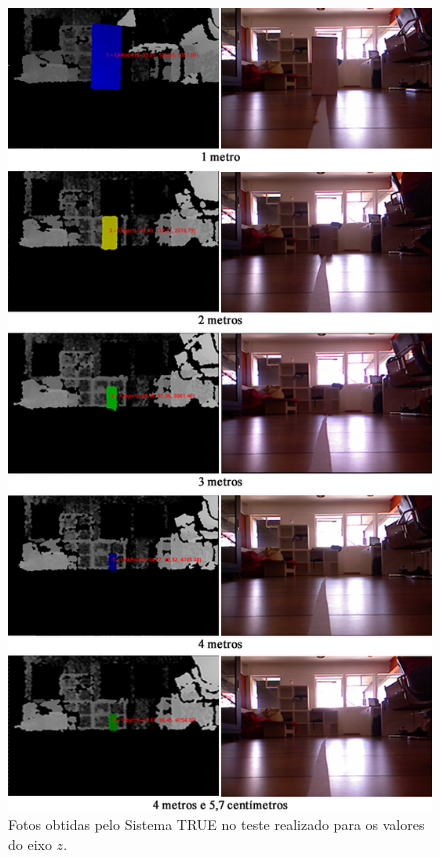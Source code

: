 	\begin{figure}[htb]
		\begin{center}
			\includegraphics[scale=0.6]{figuras/5.Testes/eixoz-imgs.png}
		\end{center}
		\caption{Fotos obtidas pelo Sistema TRUE no teste realizado para os valores do eixo $\displaystyle z$.}
		\label{fig:distancias}
	\end{figure}

